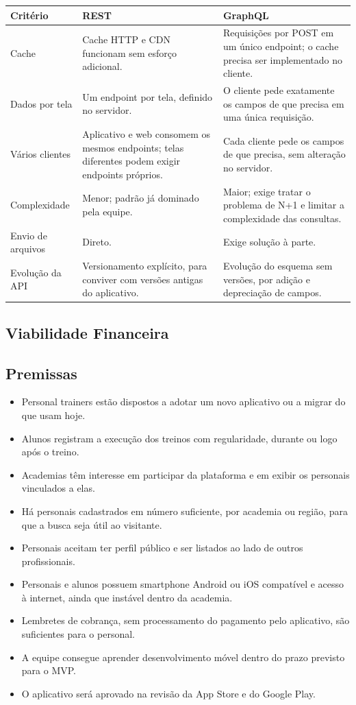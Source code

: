 \begin{tabularx}{\textwidth}{@{}l L L@{}}
  \toprule
  \textbf{Critério} & \textbf{REST} & \textbf{GraphQL} \\
  \midrule
  Cache             & Cache HTTP e CDN funcionam sem esforço adicional. & Requisições por POST em um único endpoint; o cache precisa ser implementado no cliente. \\
  Dados por tela    & Um endpoint por tela, definido no servidor. & O cliente pede exatamente os campos de que precisa em uma única requisição. \\
  Vários clientes   & Aplicativo e web consomem os mesmos endpoints; telas diferentes podem exigir endpoints próprios. & Cada cliente pede os campos de que precisa, sem alteração no servidor. \\
  Complexidade      & Menor; padrão já dominado pela equipe. & Maior; exige tratar o problema de N+1 e limitar a complexidade das consultas. \\
  Envio de arquivos & Direto. & Exige solução à parte. \\
  Evolução da API   & Versionamento explícito, para conviver com versões antigas do aplicativo. & Evolução do esquema sem versões, por adição e depreciação de campos. \\
  \bottomrule
\end{tabularx}


\subsection{Viabilidade Financeira}

\subsection{Premissas}
\begin{itemize}
  \item Personal trainers estão dispostos a adotar um novo aplicativo ou a migrar do que usam hoje.
  \item Alunos registram a execução dos treinos com regularidade, durante ou logo após o treino.
  \item Academias têm interesse em participar da plataforma e em exibir os personais vinculados a elas.
  \item Há personais cadastrados em número suficiente, por academia ou região, para que a busca seja útil ao visitante.
  \item Personais aceitam ter perfil público e ser listados ao lado de outros profissionais.
  \item Personais e alunos possuem smartphone Android ou iOS compatível e acesso à internet, ainda que instável dentro da academia.
  \item Lembretes de cobrança, sem processamento do pagamento pelo aplicativo, são suficientes para o personal.
  \item A equipe consegue aprender desenvolvimento móvel dentro do prazo previsto para o MVP.
  \item O aplicativo será aprovado na revisão da App Store e do Google Play.
\end{itemize}
